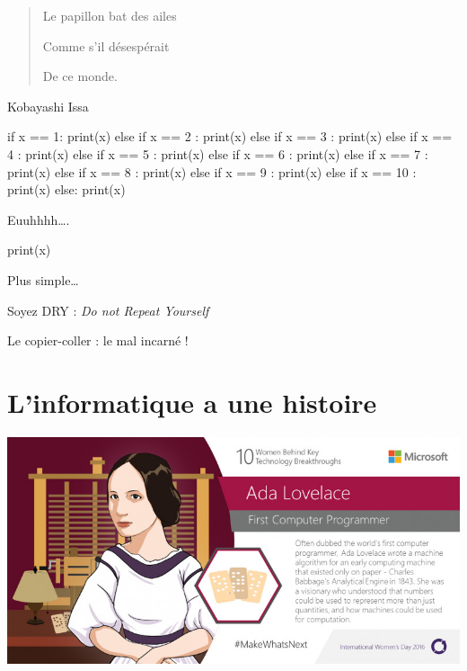 \documentclass[french]{beamer}
\begin{document}
\begin{frame}

\begin{quote}
Le papillon bat des ailes

Comme s'il désespérait

De ce monde.
\end{quote}

Kobayashi Issa

\end{frame}


\begin{frame}[fragile]

  \begin{pythoncode}
if x == 1:
   print(x)
else if x == 2 :
   print(x)
else if x == 3 :
   print(x)
else if x == 4 :
   print(x)
else if x == 5 :
   print(x)
else if x == 6 :
   print(x)
else if x == 7 :
   print(x)
else if x == 8 :
   print(x)
else if x == 9 :
   print(x)
else if x == 10 :
   print(x)
else:
   print(x)
\end{pythoncode}




Euuhhhh\ldots{}.

\end{frame}

\begin{frame}[fragile]

  \begin{pythoncode}
print(x)
\end{pythoncode}




Plus simple\ldots{}

Soyez DRY : \emph{Do not Repeat Yourself}

Le copier-coller : le mal incarné !

\end{frame}






\section{L'informatique a une histoire}


\begin{frame}
  \begin{center}
\includegraphics[height=.7\textheight]{./ada.jpg}
    
  \end{center}


\end{frame}
\end{document}
